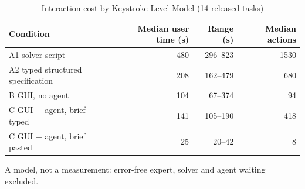 \begin{table}[t]
\centering\small
\caption{Interaction cost by Keystroke-Level Model (14 released tasks)}
\label{tab:t10_x6b_klm}
\begin{tabular}{lrrr}
\toprule
Condition & Median user time (s) & Range (s) & Median actions \\
\midrule
A1 solver script & 480 & 296--823 & 1530 \\
A2 typed structured specification & 208 & 162--479 & 680 \\
B GUI, no agent & 104 & 67--374 & 94 \\
C GUI + agent, brief typed & 141 & 105--190 & 418 \\
C GUI + agent, brief pasted & 25 & 20--42 & 8 \\
\bottomrule
\end{tabular}
\par\smallskip\footnotesize A model, not a measurement: error-free expert, solver and agent waiting excluded.
\end{table}
